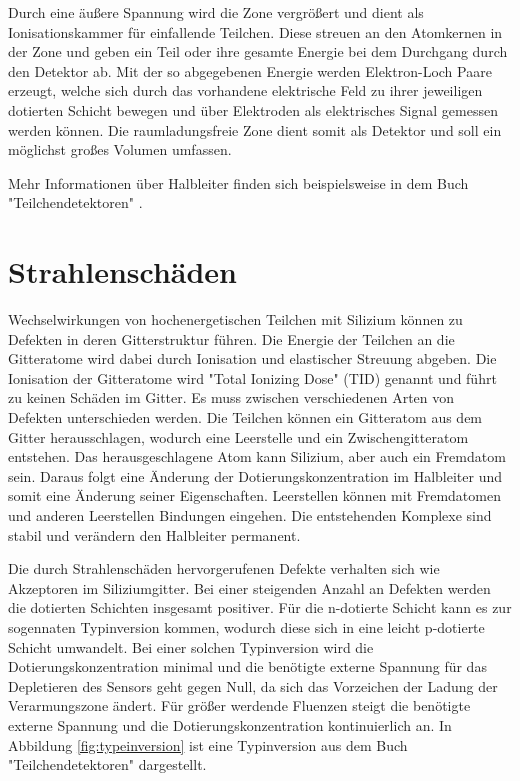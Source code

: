 Durch eine äußere Spannung wird die Zone vergrößert und dient als Ionisationskammer für einfallende Teilchen. Diese streuen
an den Atomkernen in der Zone und geben ein Teil oder ihre gesamte Energie bei dem Durchgang durch den Detektor ab. Mit der so abgegebenen
Energie werden Elektron-Loch Paare erzeugt, welche sich durch das vorhandene elektrische Feld zu ihrer jeweiligen dotierten
Schicht bewegen und über Elektroden als elektrisches Signal gemessen werden können.
Die raumladungsfreie Zone dient somit als Detektor und soll ein möglichst großes Volumen umfassen.

Mehr Informationen über Halbleiter finden sich beispielsweise in dem Buch "Teilchendetektoren"  \cite{semiconductor}.

\section{Strahlenschäden}
Wechselwirkungen von hochenergetischen Teilchen mit Silizium können zu Defekten in deren
Gitterstruktur führen.
Die Energie der Teilchen an die Gitteratome wird dabei durch Ionisation und elastischer Streuung abgeben. Die Ionisation der
Gitteratome wird "Total Ionizing Dose" (TID) genannt und führt zu keinen Schäden im Gitter.
Es muss zwischen verschiedenen Arten von Defekten unterschieden werden. Die Teilchen können ein Gitteratom aus dem
Gitter herausschlagen, wodurch eine Leerstelle und ein Zwischengitteratom entstehen. Das herausgeschlagene Atom
kann Silizium, aber auch ein Fremdatom sein. Daraus folgt eine Änderung der Dotierungskonzentration im
Halbleiter und somit eine Änderung seiner Eigenschaften.
Leerstellen können mit Fremdatomen und anderen Leerstellen Bindungen eingehen. Die
entstehenden Komplexe sind stabil und verändern den Halbleiter permanent.

Die durch Strahlenschäden hervorgerufenen Defekte verhalten sich wie Akzeptoren im Siliziumgitter. Bei
einer steigenden Anzahl an Defekten werden die dotierten Schichten insgesamt positiver. Für die n-dotierte Schicht kann
es zur sogennaten Typinversion kommen, wodurch diese sich in eine leicht p-dotierte Schicht umwandelt. Bei einer
solchen Typinversion wird die Dotierungskonzentration minimal und die benötigte externe Spannung für das Depletieren des Sensors geht gegen Null, da sich
das Vorzeichen der Ladung der Verarmungszone ändert.
Für größer werdende Fluenzen steigt die benötigte externe Spannung und die
Dotierungskonzentration kontinuierlich an.
In Abbildung \ref{fig:typeinversion} ist eine Typinversion aus dem Buch "Teilchendetektoren" dargestellt.

